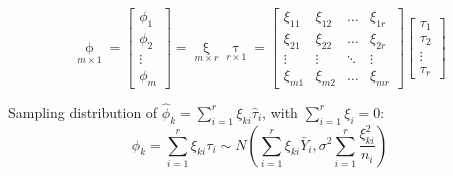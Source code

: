 \begin{equation}
    \mathop{\phi }\limits_{m\times 1} =\begin{bmatrix}
        \phi _1\\\phi _2\\\vdots\\\phi _m
    \end{bmatrix} 
    =\mathop{\xi }\limits_{m\times r} \mathop{\tau}\limits_{r\times 1}  =
    \begin{bmatrix}
    \xi _{11}&\xi _{12}&\ldots&\xi _{1r}\\
    \xi _{21}&\xi _{22}&\ldots&\xi _{2r}\\
    \vdots&\vdots&\ddots&\vdots\\
    \xi _{m1}&\xi _{m2}&\ldots&\xi _{mr}
    \end{bmatrix}\begin{bmatrix}
        \tau_1\\\tau_2\\\vdots\\\tau_r
    \end{bmatrix}
\end{equation}

Sampling distribution of $ \hat{\phi }_k=\sum\limits_{i=1}^r\xi _{ki}\hat{\tau}_i $, with $ \sum\limits_{i=1}^r\xi _i=0 $:
    \begin{equation}
        \phi_k=\sum_{i=1}^r\xi _{ki}\tau_i\sim N(\sum_{i=1}^r\xi _{ki}\bar{Y}_i,\sigma ^2\sum_{i=1}^r\dfrac{\xi _{ki}^2}{n_i})
    \end{equation}
    
